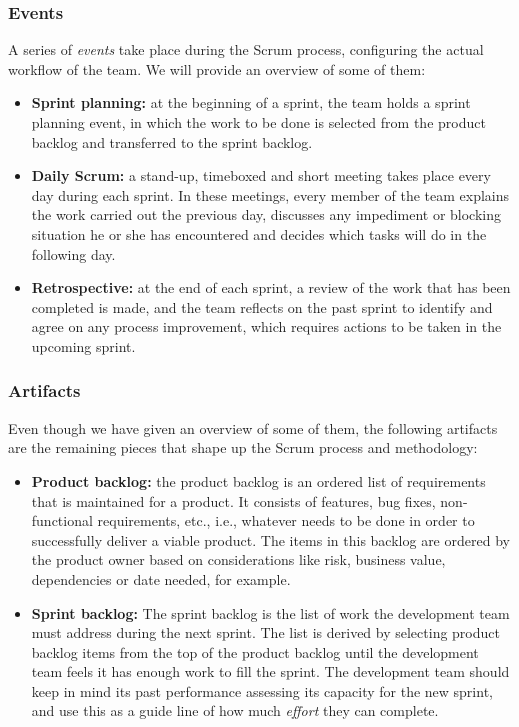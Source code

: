\subsubsection*{Events}

A series of \textit{events} take place during the Scrum process, configuring the actual workflow of the team. We will provide an overview of some of them:

\begin{itemize}
	\item
	\textbf{Sprint planning:} at the beginning of a sprint, the team holds a sprint planning event, in which the work to be done is selected from the product backlog and transferred to the sprint backlog.
	
	\item
	\textbf{Daily Scrum:} a stand-up, timeboxed and short meeting takes place every day during each sprint. In these meetings, every member of the team explains the work carried out the previous day, discusses any impediment or blocking situation he or she has encountered and decides which tasks will do in the following day.
	
	\item
	\textbf{Retrospective:} at the end of each sprint, a review of the work that has been completed is made, and the team reflects on the past sprint to identify and agree on any process improvement, which requires actions to be taken in the upcoming sprint.
\end{itemize}

\subsubsection*{Artifacts}

Even though we have given an overview of some of them, the following artifacts are the remaining pieces that shape up the Scrum process and methodology:

\begin{itemize}
	\item
	\textbf{Product backlog:} the product backlog is an ordered list of requirements that is maintained for a product. It consists of features, bug fixes, non-functional requirements, etc., i.e., whatever needs to be done in order to successfully deliver a viable product. The items in this backlog are ordered by the product owner based on considerations like risk, business value, dependencies or date needed, for example.
	
	\item
	\textbf{Sprint backlog:} The sprint backlog is the list of work the development team must address during the next sprint. The list is derived by selecting product backlog items from the top of the product backlog until the development team feels it has enough work to fill the sprint. The development team should keep in mind its past performance assessing its capacity for the new sprint, and use this as a guide line of how much \textit{effort} they can complete.
\end{itemize}

